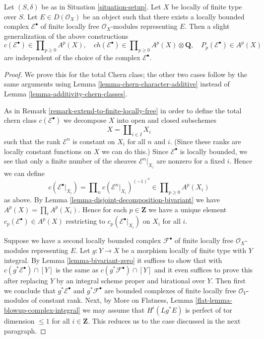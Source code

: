 \begin{lemma}
\label{lemma-pre-derived-chern-class}
Let $(S, \delta)$ be as in Situation \ref{situation-setup}.
Let $X$ be locally of finite type over $S$. Let $E \in D(\mathcal{O}_X)$
be an object such that there exists a locally bounded complex
$\mathcal{E}^\bullet$ of finite locally free $\mathcal{O}_X$-modules
representing $E$. Then a slight generalization of the above constructions
$$
c(\mathcal{E}^\bullet) \in \prod\nolimits_{p \geq 0} A^p(X),\quad
ch(\mathcal{E}^\bullet) \in
\prod\nolimits_{p \geq 0} A^p(X) \otimes \mathbf{Q},\quad
P_p(\mathcal{E}^\bullet) \in A^p(X)
$$
are independent of the choice of the complex $\mathcal{E}^\bullet$.
\end{lemma}

\begin{proof}
We prove this for the total Chern class; the other two cases follow
by the same arguments using
Lemma \ref{lemma-chern-character-additive}
instead of
Lemma \ref{lemma-additivity-chern-classes}.

\medskip\noindent
As in Remark \ref{remark-extend-to-finite-locally-free} in order
to define the total chern class $c(\mathcal{E}^\bullet)$
we decompose $X$ into open and closed subschemes
$$
X = \coprod\nolimits_{i \in I} X_i
$$
such that the rank $\mathcal{E}^n$ is constant on $X_i$ for
all $n$ and $i$. (Since these ranks are locally constant functions
on $X$ we can do this.) Since $\mathcal{E}^\bullet$ is locally
bounded, we see that only a finite number of the sheaves
$\mathcal{E}^n|_{X_i}$ are nonzero for a fixed $i$. Hence we
can define
$$
c(\mathcal{E}^\bullet|_{X_i}) =
\prod\nolimits_n c(\mathcal{E}^n|_{X_i})^{(-1)^n}
\in \prod\nolimits_{p \geq 0} A^p(X_i)
$$
as above. By Lemma \ref{lemma-disjoint-decomposition-bivariant}
we have $A^p(X) = \prod_i A^p(X_i)$. Hence for each $p \in \mathbf{Z}$
we have a unique element $c_p(\mathcal{E}^\bullet) \in A^p(X)$ restricting
to $c_p(\mathcal{E}^\bullet|_{X_i})$ on $X_i$ for all $i$.

\medskip\noindent
Suppose we have a second locally bounded complex
$\mathcal{F}^\bullet$ of finite locally free $\mathcal{O}_X$-modules
representing $E$.
Let $g : Y \to X$ be a morphism locally of finite type with $Y$ integral.
By Lemma \ref{lemma-bivariant-zero} it suffices to show that
with $c(g^*\mathcal{E}^\bullet) \cap [Y]$ is the same as
$c(g^*\mathcal{F}^\bullet) \cap [Y]$ and it even suffices to prove
this after replacing $Y$ by an integral scheme proper and birational
over $Y$. Then first we conclude that $g^*\mathcal{E}^\bullet$
and $g^*\mathcal{F}^\bullet$ are bounded complexes of finite locally
free $\mathcal{O}_Y$-modules of constant rank. Next, by
More on Flatness, Lemma \ref{flat-lemma-blowup-complex-integral}
we may assume that $H^i(Lg^*E)$ is perfect of tor dimension $\leq 1$
for all $i \in \mathbf{Z}$.
This reduces us to the case discussed in the next paragraph.


\end{proof}

